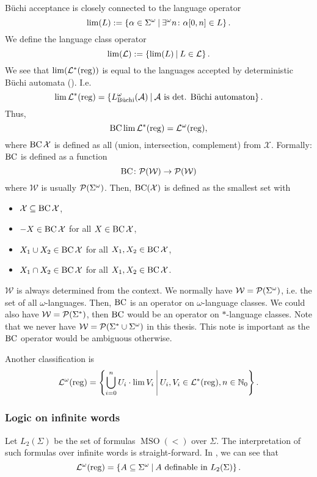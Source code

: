 Büchi acceptance is closely connected to the language operator
\[ \lim(L) := \Set{ \alpha \in \Sigma^\omega }{ \existsinf n \colon \alpha[0,n] \in L } . \]
We define the language class operator
\[ \lim(\Lang) := \Set{\lim(L)}{L \in \Lang} . \]
We see that $\lim(\mathcal{L}^*(\textup{\textrm{reg}}))$ is equal to the languages accepted by deterministic Büchi automata (\cite{InfCompR101}). %
I.e.
\[ \lim \Langreg = \Set{L^\omega_\text{Büchi}(\A)}{\text{$\A$ is det. Büchi automaton}} . \]
Thus,
\[  \operatorname{BC} \lim \mathcal{L}^*(\textup{\textrm{reg}}) = \mathcal{L}^\omega(\textup{\textrm{reg}}) , \]
where $\operatorname{BC} \mathcal{X}$ is defined as all  (union, intersection, complement) from $\mathcal{X}$. Formally: $\operatorname{BC}$ is defined as a function
\[ \operatorname{BC} \colon \mathcal{P}(\mathcal{W}) \rightarrow \mathcal{P}(\mathcal{W}) \]
where $\mathcal{W}$ is usually $\mathcal{P}(\Sigma^\omega)$. Then, $\operatorname{BC}(\mathcal{X})$ is defined as the smallest set with
\begin{itemize}
\item $\mathcal{X} \subseteq \operatorname{BC} \mathcal{X}$,
\item $-X \in \operatorname{BC} \mathcal{X}$ for all $X \in \operatorname{BC} \mathcal{X}$,
\item $X_1 \cup X_2 \in \operatorname{BC} \mathcal{X}$ for all $X_1,X_2 \in \operatorname{BC} \mathcal{X}$,
\item $X_1 \cap X_2 \in \operatorname{BC} \mathcal{X}$ for all $X_1,X_2 \in \operatorname{BC} \mathcal{X}$.
\end{itemize}
$\mathcal{W}$ is always determined from the context. We normally have $\mathcal{W} = \mathcal{P}(\Sigma^\omega)$, i.e. the set of all $\omega$-languages. Then, $\operatorname{BC}$ is an operator on $\omega$-language classes. We could also have $\mathcal{W} = \mathcal{P}(\Sigma^*)$, then $\operatorname{BC}$ would be an operator on $*$-language classes. Note that we never have $\mathcal{W} = \mathcal{P}(\Sigma^* \cup \Sigma^\omega)$ in this thesis. This note is important as the $\operatorname{BC}$ operator would be ambiguous otherwise.

Another classification is
\[ \LangOreg = \Set{ \bigcup_{i=0}^n U_i \cdot \lim V_i }{ U_i, V_i \in \Langreg, n \in \N_0 } . \]

\subsubsection{Logic on infinite words}
Let $L_2(\Sigma)$ be the set of formulas $\operatorname{MSO}(<)$ over $\Sigma$. The interpretation of such formulas over infinite words is straight-forward. In \cite[Theorem 3.1]{CombR107}, we can see that
\[ \LangOreg = \Set{A \subseteq \Sigma^\omega}{A \text{ definable in } L_2(\Sigma)} . \]

